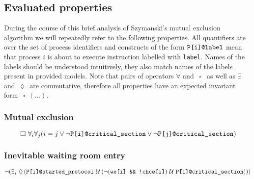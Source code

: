 

\usepackage{multirow}
\usepackage{pifont}
\newcommand{\ok}{\ding{51}}
\newcommand{\xx}{\ding{55}}

\newcommand{\eventually}{\, \operatorname{\lozenge} \,}
\newcommand{\always}{\, \operatorname{\square} \,}
\newcommand{\until}{\, \operatorname{\mathcal{U}} \,}




\subsection*{Evaluated properties}

During the course of this brief analysis of Szymanski's mutual exclusion algorithm we will repeatedly refer to the following properties.
All quantifiers are over the set of process identifiers and constructs of the form $\verb+P[i]@label+$ mean that process $i$ is about to execute instruction labelled with \verb+label+.
Names of the labels should be understood intuitively, they also match names of the labels present in provided models.
Note that pairs of operators $\forall$ and $\always$ as well as $\exists$ and $\eventually$ are commutative, therefore all properties have an expected invariant form $\always (\ldots)$.

\subsubsection*{Mutual exclusion}

\begin{equation}
\always \forall_i \forall_j (i = j \lor \neg \verb+P[i]@critical_section+ \lor \neg \verb+P[j]@critical_section+) \label{mutual_exclusion}
\end{equation}

\subsubsection*{Inevitable waiting room entry}

\begin{equation}
\neg (\exists_i \eventually (\verb+P[i]@started_protocol+ \until (\neg (\verb+we[i] && !chce[i]+) \until \verb+P[i]@critical_section+))) \label{inevitable_anteroom}
\end{equation}

